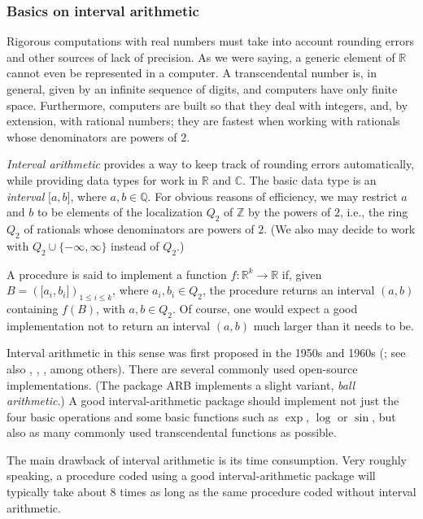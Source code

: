 \subsubsection{Basics on interval arithmetic}

Rigorous computations with real numbers must take into account rounding errors
and other sources of lack of precision. As we were saying, a
generic element of $\mathbb{R}$ cannot even be represented
in a computer. A transcendental number is, in general, given by an infinite
sequence of digits, and computers have only finite space. Furthermore, computers
are built so that they deal with integers, and, by extension, with
rational numbers;
they are fastest when working with rationals whose denominators are powers of
$2$.

{\em Interval arithmetic} provides a way to keep track of rounding errors
  automatically, while providing data types for work in $\mathbb{R}$ and
  $\mathbb{C}$. 
  The basic data type is an {\em interval} $\lbrack a,b\rbrack$, where
  $a,b\in \mathbb{Q}$. For obvious reasons of efficiency, we may
  restrict $a$ and $b$ to be elements of the localization $Q_2$ of $\mathbb{Z}$
  by the powers of $2$, i.e., the ring $Q_2$ of rationals whose
  denominators are powers of $2$. (We also may decide to work with
  $Q_2 \cup \{-\infty,\infty\}$ instead of $Q_2$.)

  A procedure is said to implement a function $f:\mathbb{R}^k\to
  \mathbb{R}$ if, given $B = (\lbrack a_i,b_i\rbrack)_{1\leq i\leq k}$,
  where $a_i,b_i \in Q_2$, the procedure returns an interval $(a,b)$
  containing $f(B)$, with $a,b\in Q_2$. Of course, one would expect a good
  implementation not to return an interval $(a,b)$ much larger than 
  it needs to be.

  Interval arithmetic in this sense was first proposed in the 1950s and 1960s
  (\cite{moore}; see also \cite{Young1931}, \cite{warmus1956},
  \cite{sunaga2009}, among others).
  There are several commonly used open-source implementations.
  (The package ARB \cite{Johansson2017arb} implements a slight variant, {\em ball arithmetic}.)
  A good interval-arithmetic package should implement not just the four
  basic operations and some basic functions such as $\exp$, $\log$ or $\sin$,
  but also as many commonly used transcendental functions as possible.

  The main drawback of interval arithmetic is its time consumption.
  Very roughly speaking, a procedure coded using a good
  interval-arithmetic package
  will typically take about $8$ times as long as the same
  procedure coded without interval arithmetic.

